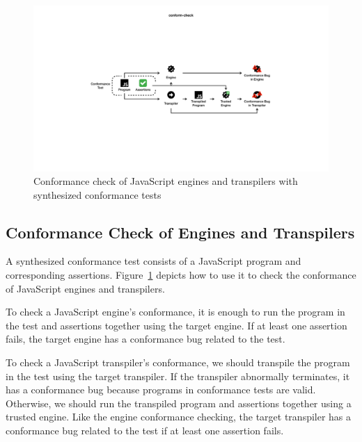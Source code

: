 \begin{figure}
  \includegraphics[width=\textwidth]{img/conform-check}
\vspace*{-1.5em}
  \caption{
    Conformance check of JavaScript engines and transpilers with synthesized
    conformance tests
  }
  \label{fig:conform-check}
\end{figure}


\subsection{Conformance Check of Engines and Transpilers}
%
A synthesized conformance test consists of a JavaScript program and
corresponding assertions.
Figure~\ref{fig:conform-check} depicts how to use it to check the conformance of
JavaScript engines and transpilers.

To check a JavaScript engine's conformance,
it is enough to run the program in the test and assertions together using the target engine.
If at least one assertion fails, the target engine has a conformance bug related to the test.

To check a JavaScript transpiler's conformance,
we should transpile the program in the test using the target transpiler.
If the transpiler abnormally terminates, it has a conformance bug because
programs in conformance tests are valid.
Otherwise, we should run the transpiled program and assertions together
using a trusted engine.
Like the engine conformance checking, the target transpiler has a conformance bug
related to the test if at least one assertion fails.
